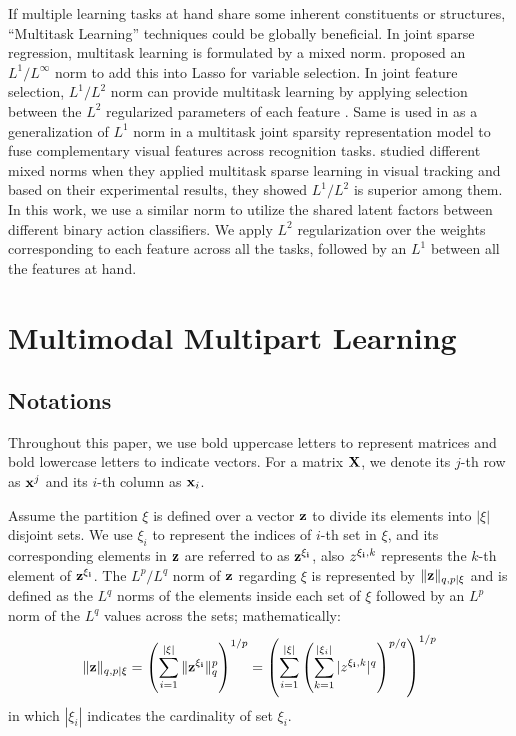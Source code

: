 \documentclass[9pt,technote,compsoc]{IEEEtran}
\begin{document}
If multiple learning tasks at hand share some inherent constituents or structures, ``Multitask Learning'' \cite{multitask1997} techniques could be globally beneficial. In joint sparse regression, multitask learning is formulated by a mixed norm. \cite{icml2009_LiuPZ09} proposed an $L^1/L^\infty$ norm to add this into Lasso for variable selection. In joint feature selection, $L^1/L^2$ norm can provide multitask learning by applying selection between the $L^2$ regularized parameters of each feature \cite{obozinski2010joint}. Same is used in \cite{multitaskTIP} as a generalization of $L^1$ norm in a multitask joint sparsity representation model to fuse complementary visual features across recognition tasks.\cite{6247908} studied different mixed norms when they applied multitask sparse learning in visual tracking and based on their experimental results, they showed $L^1/L^2$ is superior among them. In this work, we use a similar norm to utilize the shared latent factors between different binary action classifiers. We apply $L^2$ regularization over the weights corresponding to each feature across all the tasks, followed by an $L^1$ between all the features at hand.


\section{Multimodal Multipart Learning}

\subsection*{Notations}

Throughout this paper, we use bold uppercase letters to represent matrices and bold lowercase letters to indicate vectors. For a matrix $\bf X$, we denote its $j$-th row as ${\bf x}^j$ and its $i$-th column as ${\bf x}_i$.

Assume the partition $\xi$ is defined over a vector ${\bf z}$ to divide its elements into $|\xi|$ disjoint sets. We use $\xi_i$ to represent the indices of $i$-th set in $\xi$, and its corresponding elements in $\bf z$ are referred to as $\bf z^{\xi_i}$, also $z^{{\bf \xi_i},k}$ represents the $k$-th element of $\bf z^{\bf \xi_i}$. The $L^p/L^q$ norm of $\bf z$ regarding $\xi$ is represented by $\|{\bf z}\|_{q,p|\xi}$ and is defined as the $L^q$ norms of the elements inside each set of $\xi$ followed by an $L^p$ norm of the $L^q$ values across the sets; mathematically:
\begin{equation}
\label{eqn_mixednorm2}\|{\bf z}\|_{q,p|\xi}=
\left(\sum_{i=1}^{|\xi|}\|{\bf z^{\xi_i}}\|_q^p\right)^{1/p}=
\left(\sum_{i=1}^{|\xi|}{\left(\sum_{k=1}^{|\xi_i|}|z^{{\bf \xi_i},k}|^q\right)}^{p/q}\right)^{1/p}
\end{equation}
in which $|\xi_i|$ indicates the cardinality of set $\xi_i$.
\end{document}
